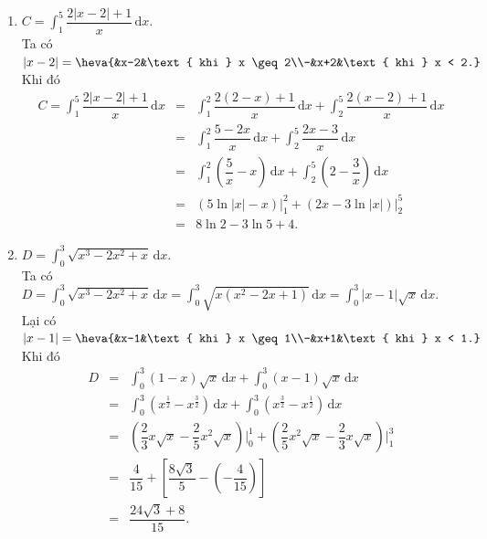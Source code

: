 \begin{bt}
{\begin{enumerate}
\begin{center}
			\end{center}
			Khi đó \begin{eqnarray*}
			 B&=&\int_{-1}^2(x+|1-x|-|x+2|) \mathrm{\,d}x\\
			&=&\int_{-1}^1(-x-1) \mathrm{\,d}x+\int_1^2(x-3)  \mathrm{\,d}x\\
			&=&\left(-\dfrac{x^2}{2}-x\right)\bigg|_{-1}^1+\left(\dfrac{x^2}{2}-3x\right)\bigg|_1 ^2\\ 
			&=&-\dfrac{7}{2}. 
		\end{eqnarray*}
		\item $C=\displaystyle\int_1^5\dfrac{2|x-2|+1}{x}  \mathrm{\,d}x$.\\
		 Ta có $|x-2|=\heva{&x-2&\text{ khi } x \geq 2\\-&x+2&\text{ khi } x < 2.}$\\
		Khi  đó
		\begin{eqnarray*}
			C=\int_1^5\dfrac{2|x-2|+1}{x} \mathrm{\,d}x&=&\int_1^2\dfrac{2(2-x)+1}{x} \mathrm{\,d}x+\int_2^5\dfrac{2(x-2)+1}{x}  \mathrm{\,d}x\\
			&=&\int_1^2\dfrac{5-2x}{x} \mathrm{\,d}x+\int_2^5\dfrac{2x-3}{x}  \mathrm{\,d}x\\
			&=&\int_1^2\left(\dfrac{5}{x}-x\right) \mathrm{\,d}x+\int_2^5\left(2-\dfrac{3}{x}\right) \mathrm{\,d}x\\ 
			 &=&\left(5\ln|x|-x\right)\bigg|_1 ^2+\left(2x-3\ln|x|\right)\bigg|_2 ^5\\
			&=&8\ln 2-3\ln 5+4. 
		\end{eqnarray*}
		\item $D=\displaystyle\int_0^3\sqrt{x^3-2x^2+x} \mathrm{\,d}x$.\\ 
		Ta  có $D=\displaystyle\int_0^3\sqrt{x^3-2x^2+x} \mathrm{\,d}x=\int_0^3\sqrt{x\left(x^2-2x+1\right)} \mathrm{\,d}x=\int_0^3|x-1|\sqrt{x} \mathrm{\,d}x$.\\
		 Lại có $|x-1|=\heva{&x-1&\text{ khi } x \geq 1\\-&x+1&\text{ khi } x < 1.}$\\
		 Khi đó
		\begin{eqnarray*}
			D&=&\int_0^3(1-x)  \sqrt{x} \mathrm{\,d}x+\int_0^3(x-1) \sqrt{x} \mathrm{\,d}x\\
			&=&\int_0^3\left(x^{\tfrac{1}{2}}-x^{\tfrac{3}{2}}\right) \mathrm{\,d}x+\int_0^3\left(x^{\tfrac{3}{2}}-x^{\tfrac{1}{2}}\right)  \mathrm{\,d}x\\
			&=&\left(\dfrac{2}{3}  x \sqrt{x}-\dfrac{2}{5} x^2\sqrt{x}\right)\bigg|_0 ^1+\left(\dfrac{2}{5} x^2\sqrt{x}-\dfrac{2}{3} x \sqrt{x}\right)\bigg|_1 ^3\\
			 &=&\dfrac{4}{15}+\left[\dfrac{8\sqrt{3}}{5}-\left(-\dfrac{4}{15}\right)\right]\\
			&=&\dfrac{24\sqrt{3}+8}{15}. 
		\end{eqnarray*}
	\end{enumerate}
 }
\end{bt}

